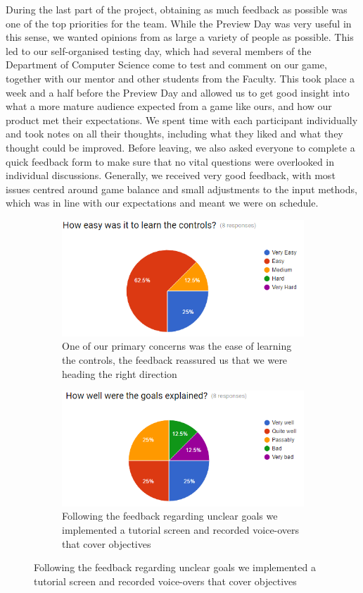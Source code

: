 \documentclass[a4paper,11pt]{article}
\begin{document}
During the last part of the project, obtaining as much feedback as possible was one of the top priorities for the team. While the Preview Day was very useful in this sense, we wanted opinions from as large a variety of people as possible. This led to our self-organised testing day, which had several members of the Department of Computer Science come to test and comment on our game, together with our mentor and other students from the Faculty. This took place a week and a half before the Preview Day and allowed us to get good insight into what a more mature audience expected from a game like ours, and how our product met their expectations. We spent time with each participant individually and took notes on all their thoughts, including what they liked and what they thought could be improved. Before leaving, we also asked everyone to complete a quick feedback form to make sure that no vital questions were overlooked in individual discussions. Generally, we received very good feedback, with most issues centred around game balance and small adjustments to the input methods, which was in line with our expectations and meant we were on schedule.
\begin{figure}[ht]
	\centering
    \caption{Two results from internal test session}
    \begin{subfigure}[b]{0.45\textwidth}
    	\centering
    	\includegraphics[scale=0.45]{control_feedback}
    	\caption{One of our primary concerns was the ease of learning the controls, the feedback reassured us that we were heading the right direction}
    \end{subfigure}
    \begin{subfigure}[b]{0.45\textwidth}
    	\centering
    	\includegraphics[scale=0.45]{goal_feedback}
    	\caption{Following the feedback regarding unclear goals we implemented a tutorial screen and recorded voice-overs that cover objectives}
    \end{subfigure}
\end{figure}
\end{document}
